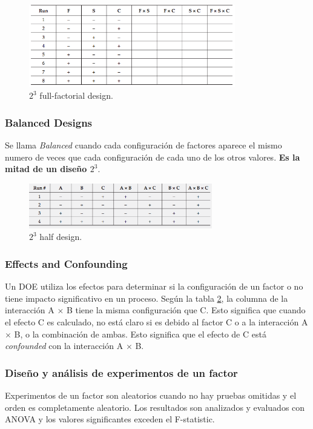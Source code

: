 \documentclass[]{article}
\begin{document}
\begin{figure}[H]
	\centering
	\includegraphics[width=90mm]{imagenes/a23design.png}
	\caption{$2^3$ full-factorial design.}
	\label{fig:A23design}
\end{figure}

\subsubsection{Balanced Designs}
Se llama \textit{Balanced} cuando cada configuración de factores aparece el mismo numero de veces que cada configuración de cada uno de los otros valores. \textbf{Es la mitad de un diseño $2^3$}.

\begin{figure}[H]
	\centering
	\includegraphics[width=80mm]{imagenes/a23halfdesign.png}
	\caption{$2^3$ half design.}
	\label{fig:a23halfdesign}
\end{figure}

\subsubsection{Effects and Confounding}

Un DOE utiliza los efectos para determinar si la configuración de un factor o no tiene impacto significativo en un proceso. 
Según la tabla \ref{fig:a23halfdesign}, la columna de la interacción A $\times$ B tiene la misma configuración que C. Esto significa que cuando el efecto C es calculado, no está claro si es debido al factor C o a la interacción A $\times$ B, o la combinación de ambas. Esto significa que el efecto de C está \textit{confounded} con la interacción A $\times$ B.

\subsubsection{Diseño y análisis de experimentos de un factor}
Experimentos de un factor son aleatorios cuando no hay pruebas omitidas y el orden es completamente aleatorio. Los resultados son analizados y evaluados con ANOVA y los valores significantes exceden el F-statistic.
\end{document}
